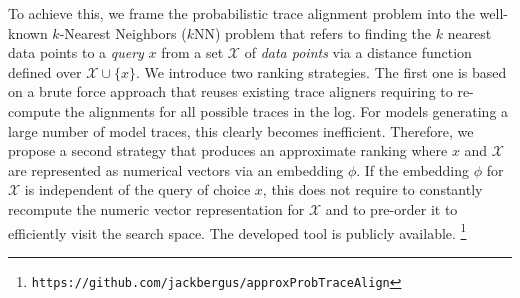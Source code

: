 To achieve this, we frame the probabilistic trace alignment problem into the well-known $k$-Nearest Neighbors ($k$NN) problem \cite{Altman} that refers to finding the $k$ nearest data points to a \textit{query} $x$ from a set $\mathcal{X}$ of \textit{data points} via a distance function defined over $\mathcal{X}\cup\{x\}$.
We introduce two ranking strategies. The first one is based on a brute force approach that reuses existing trace aligners  \cite{LeoniM17} %
requiring to re-compute the alignments for all possible traces in the log. For models generating a large number of model traces, this clearly becomes inefficient. Therefore, we propose a second strategy that produces an approximate ranking where $x$ and $\mathcal{X}$ are represented as numerical vectors via an embedding $\phi$.
If the embedding $\phi$ for $\mathcal{X}$ is independent of the query of choice $x$, this does not require to constantly recompute the numeric vector representation for $\mathcal{X}$ and to pre-order it to efficiently visit the search space. The developed tool is publicly available.
\footnote{\texttt{https://github.com/jackbergus/approxProbTraceAlign}}

